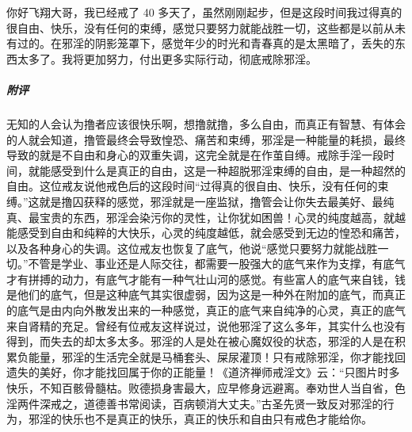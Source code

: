\begin{case}
    你好飞翔大哥，我已经戒了 40 多天了，虽然刚刚起步，但是这段时间我过得真的很自由、快乐，没有任何的束缚，感觉只要努力就能战胜一切，这些都是以前从未有过的。在邪淫的阴影笼罩下，感觉年少的时光和青春真的是太黑暗了，丢失的东西太多了。我将更加努力，付出更多实际行动，彻底戒除邪淫。
    \subparagraph{附评} 无知的人会认为撸者应该很快乐啊，想撸就撸，多么自由，而真正有智慧、有体会的人就会知道，撸管最终会导致惶恐、痛苦和束缚，邪淫是一种能量的耗损，最终导致的就是不自由和身心的双重失调，这完全就是在作茧自缚。戒除手淫一段时间，就能感受到什么是真正的自由，这是一种超脱邪淫束缚的自由，是一种超然的自由。这位戒友说他戒色后的这段时间“过得真的很自由、快乐，没有任何的束缚。”这就是撸囚获释的感觉，邪淫就是一座监狱，撸管会让你失去最美好、最纯真、最宝贵的东西，邪淫会染污你的灵性，让你犹如困兽！心灵的纯度越高，就越能感受到自由和纯粹的大快乐，心灵的纯度越低，就会感受到无边的惶恐和痛苦，以及各种身心的失调。这位戒友也恢复了底气，他说“感觉只要努力就能战胜一切。”不管是学业、事业还是人际交往，都需要一股强大的底气来作为支撑，有底气才有拼搏的动力，有底气才能有一种气壮山河的感觉。有些富人的底气来自钱，钱是他们的底气，但是这种底气其实很虚弱，因为这是一种外在附加的底气，而真正的底气是由内向外散发出来的一种感觉，真正的底气来自纯净的心灵，真正的底气来自肾精的充足。曾经有位戒友这样说过，说他邪淫了这么多年，其实什么也没有得到，而失去的却太多太多。邪淫的人是处在被心魔奴役的状态，邪淫的人是在积累负能量，邪淫的生活完全就是马桶套头、屎尿灌顶！只有戒除邪淫，你才能找回遗失的美好，你才能找回属于你的正能量！《道济禅师戒淫文》云：“只图片时多快乐，不知百骸骨髓枯。败德损身害最大，应早修身远避离。奉劝世人当自省，色淫两件深戒之，道德善书常阅读，百病顿消大丈夫。”古圣先贤一致反对邪淫的行为，邪淫的快乐也不是真正的快乐，真正的快乐和自由只有戒色才能给你。
\end{case}

